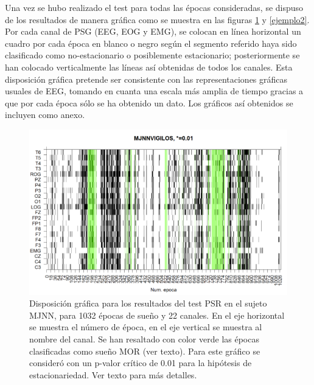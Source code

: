 Una vez se hubo realizado el test para todas las \'epocas consideradas, se dispuso de los 
resultados de manera gr\'afica  como se muestra en las figuras \ref{ejemplo1} y \ref{ejemplo2}.
Por cada canal de PSG (EEG, EOG y EMG), se colocan en l\'inea horizontal un cuadro por cada
\'epoca en blanco o negro seg\'un el segmento referido haya sido clasificado como
no-estacionario o posiblemente estacionario; posteriormente se han colocado verticalmente las
l\'ineas as\'i obtenidas de todos los canales.
Esta disposici\'on gr\'afica pretende ser consistente con las representaciones gr\'aficas
usuales de EEG, tomando en cuanta una escala m\'as amplia de tiempo gracias a que por
cada \'epoca s\'olo se ha obtenido un dato.
Los gr\'aficos as\'i obtenidos se incluyen como anexo.

\begin{figure}
\includegraphics[width=\textwidth]{est01.png} 
\caption{Disposici\'on gr\'afica para los resultados del test PSR en el sujeto MJNN, 
para 1032 \'epocas de sue\~no y 22 canales. 
En el eje horizontal se muestra el n\'umero de \'epoca, en el eje vertical se muestra al 
nombre del canal. 
Se han resaltado con color verde las \'epocas clasificadas como sue\~no MOR (ver texto).
Para este gr\'afico se consider\'o con un p-valor cr\'itico de 0.01 para la hip\'otesis
de estacionariedad. Ver texto para m\'as detalles.}
\label{ejemplo1}
\end{figure}


